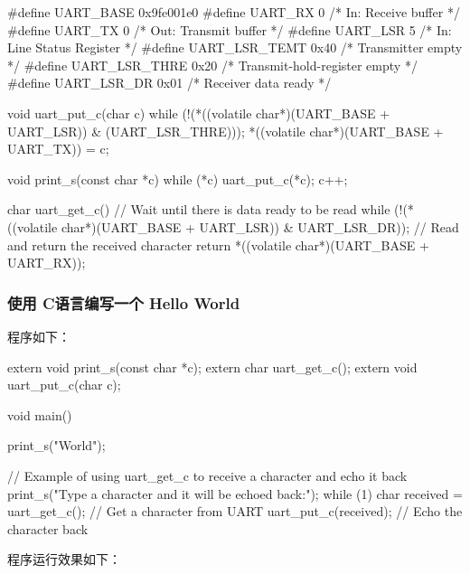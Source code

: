 \begin{CodeBlock}[language=BookC]
#define UART_BASE 0x9fe001e0
#define UART_RX     0   /* In:  Receive buffer */
#define UART_TX     0   /* Out: Transmit buffer */
#define UART_LSR    5   /* In:  Line Status Register */
#define UART_LSR_TEMT       0x40 /* Transmitter empty */
#define UART_LSR_THRE       0x20 /* Transmit-hold-register empty */
#define UART_LSR_DR         0x01 /* Receiver data ready */

void uart_put_c(char c) {
    while (!(*((volatile char*)(UART_BASE + UART_LSR)) & (UART_LSR_THRE)));
    *((volatile char*)(UART_BASE + UART_TX)) = c;
}

void print_s(const char *c) {
    while (*c) {
        uart_put_c(*c);
        c++;
    }
}

char uart_get_c() {
    // Wait until there is data ready to be read
    while (!(*((volatile char*)(UART_BASE + UART_LSR)) & UART_LSR_DR));
    // Read and return the received character
    return *((volatile char*)(UART_BASE + UART_RX));
}
\end{CodeBlock}

\subsubsection{使用 C语言编写一个 Hello World}\label{sec:02-software-preparation-014}

程序如下：

\begin{CodeBlock}[language=BookC]
extern void print_s(const char *c);
extern char uart_get_c();
extern void uart_put_c(char c);

void main() {
    print_s("\nHello World\n\n");
    
    // Example of using uart_get_c to receive a character and echo it back
    print_s("Type a character and it will be echoed back:\n");
    while (1) {
        char received = uart_get_c();  // Get a character from UART
        uart_put_c(received);          // Echo the character back
    }
}
\end{CodeBlock}

程序运行效果如下：


